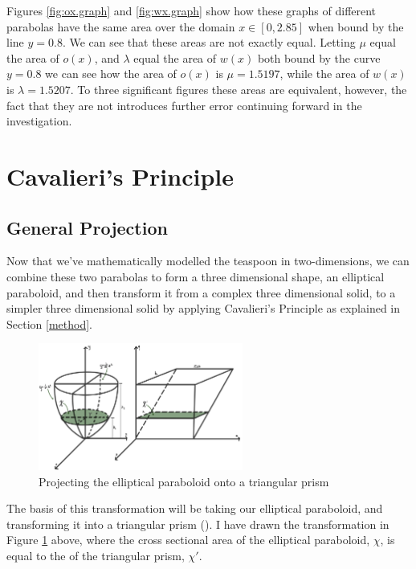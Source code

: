 \documentclass[12pt]{article}
\begin{document}
Figures \ref{fig:ox.graph} and \ref{fig:wx.graph} show how these graphs of different parabolas have the same area over the domain $x \in [0,2.85]$ when bound by the line $y=0.8$. We can see that these areas are not exactly equal. Letting $\mu$ equal the area of $o(x)$, and $\lambda$ equal the area of $w(x)$ both bound by the curve $y=0.8$ we can see how the area of $o(x)$ is $\mu = 1.5197$, while the area of $w(x)$ is $\lambda = 1.5207$. To three significant figures these areas are equivalent, however, the fact that they are not introduces further error continuing forward in the investigation.

\section{Cavalieri's Principle}
\subsection{General Projection}
Now that we've mathematically modelled the teaspoon in two-dimensions, we can combine these two parabolas to form a three dimensional shape, an elliptical paraboloid, and then transform it from a complex three dimensional solid, to a simpler three dimensional solid by applying Cavalieri's Principle as explained in Section \ref{method}. 

\begin{figure}[h]
    \centering
        \includegraphics[width=0.6\textwidth]{images/cava baby.jpg}
        \caption{Projecting the elliptical paraboloid onto a triangular prism}
        \label{fig:cava}
    \hfill
\end{figure}

The basis of this transformation will be taking our elliptical paraboloid, and transforming it into a triangular prism (\citeauthor{bogomolny}). I have drawn the transformation in Figure \ref{fig:cava} above, where the cross sectional area of the elliptical paraboloid, $\chi$, is equal to the of the triangular prism, $\chi '$.
\end{document}
